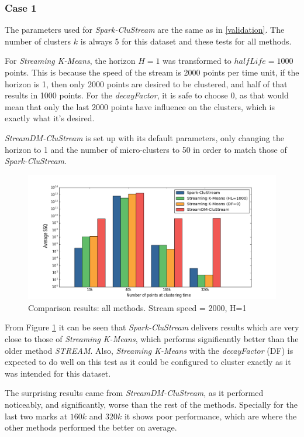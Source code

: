 \documentclass[10pt, conference, compsocconf]{IEEEtran}
\begin{document}
\subsubsection{Case 1}

The parameters used for \textit{Spark-CluStream} are the same as in \ref{validation}. The number of clusters $k$ is always 5 for this dataset and these tests for all methods.

For \textit{Streaming K-Means}, the horizon $H=1$ was transformed to $halfLife=1000$ points. This is because the speed of the stream is 2000 points per time unit, if the horizon is 1, then only 2000 points are desired to be clustered, and half of that results in 1000 points. For the \textit{decayFactor}, it is safe to choose 0, as that would mean that only the last 2000 points have influence on the clusters, which is exactly what it's desired.

\textit{StreamDM-CluStream} is set up with its default parameters, only changing the horizon to 1 and the number of micro-clusters to 50 in order to match those of \textit{Spark-CluStream}.

\begin{figure}[h]
 \centering
 \includegraphics[scale=0.3]{./styles/comparison2000.png}
 \caption{Comparison results: all methods. Stream speed = 2000, H=1}
 \label{fig:comparison2000}
\end{figure}

From Figure \ref{fig:comparison2000} it can be seen that \textit{Spark-CluStream} delivers results which are very close to those of \textit{Streaming K-Means}, which performs significantly better than the older method \textit{STREAM}. Also, \textit{Streaming K-Means} with the \textit{decayFactor} (DF) is expected to do well on this test as it could be configured to cluster exactly as it was intended for this dataset. 

The surprising results came from \textit{StreamDM-CluStream}, as it performed noticeably, and significantly, worse than the rest of the methods. Specially for the last two marks at $160k$ and $320k$ it shows poor performance, which are where the other methods performed the better on average.
\end{document}
